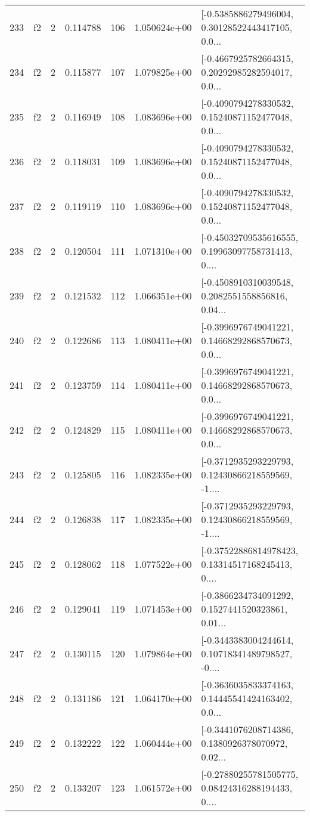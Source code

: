 \begin{tabular}{lllrlrl}
233 &  f2 &   2 &  0.114788 &  106 &  1.050624e+00 &  [-0.5385886279496004, 0.30128522443417105, 0.0... \\
234 &  f2 &   2 &  0.115877 &  107 &  1.079825e+00 &  [-0.4667925782664315, 0.20292985282594017, 0.0... \\
235 &  f2 &   2 &  0.116949 &  108 &  1.083696e+00 &  [-0.4090794278330532, 0.15240871152477048, 0.0... \\
236 &  f2 &   2 &  0.118031 &  109 &  1.083696e+00 &  [-0.4090794278330532, 0.15240871152477048, 0.0... \\
237 &  f2 &   2 &  0.119119 &  110 &  1.083696e+00 &  [-0.4090794278330532, 0.15240871152477048, 0.0... \\
238 &  f2 &   2 &  0.120504 &  111 &  1.071310e+00 &  [-0.45032709535616555, 0.19963097758731413, 0.... \\
239 &  f2 &   2 &  0.121532 &  112 &  1.066351e+00 &  [-0.4508910310039548, 0.2082551558856816, 0.04... \\
240 &  f2 &   2 &  0.122686 &  113 &  1.080411e+00 &  [-0.3996976749041221, 0.14668292868570673, 0.0... \\
241 &  f2 &   2 &  0.123759 &  114 &  1.080411e+00 &  [-0.3996976749041221, 0.14668292868570673, 0.0... \\
242 &  f2 &   2 &  0.124829 &  115 &  1.080411e+00 &  [-0.3996976749041221, 0.14668292868570673, 0.0... \\
243 &  f2 &   2 &  0.125805 &  116 &  1.082335e+00 &  [-0.3712935293229793, 0.12430866218559569, -1.... \\
244 &  f2 &   2 &  0.126838 &  117 &  1.082335e+00 &  [-0.3712935293229793, 0.12430866218559569, -1.... \\
245 &  f2 &   2 &  0.128062 &  118 &  1.077522e+00 &  [-0.37522886814978423, 0.13314517168245413, 0.... \\
246 &  f2 &   2 &  0.129041 &  119 &  1.071453e+00 &  [-0.3866234734091292, 0.1527441520323861, 0.01... \\
247 &  f2 &   2 &  0.130115 &  120 &  1.079864e+00 &  [-0.3443383004244614, 0.10718341489798527, -0.... \\
248 &  f2 &   2 &  0.131186 &  121 &  1.064170e+00 &  [-0.3636035833374163, 0.14445541424163402, 0.0... \\
249 &  f2 &   2 &  0.132222 &  122 &  1.060444e+00 &  [-0.3441076208714386, 0.1380926378070972, 0.02... \\
250 &  f2 &   2 &  0.133207 &  123 &  1.061572e+00 &  [-0.27880255781505775, 0.08424316288194433, 0.... \\

\end{tabular}
